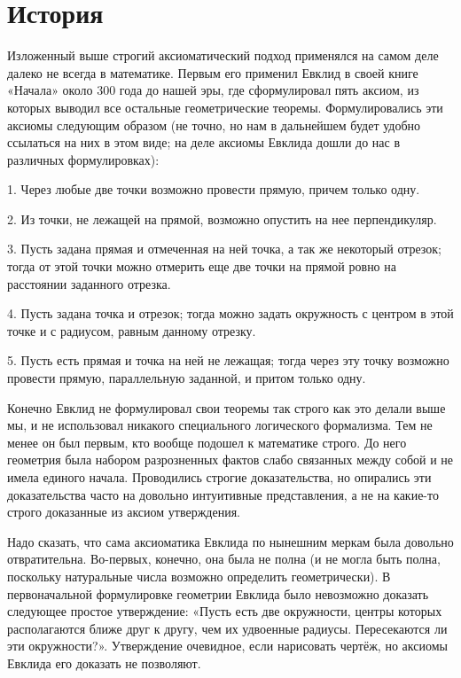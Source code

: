 \section{История}

Изложенный выше строгий аксиоматический подход применялся на самом деле далеко не всегда в математике. Первым его применил Евклид в своей книге «Начала» около 300 года до нашей эры, где сформулировал пять аксиом, из которых выводил все остальные геометрические теоремы. Формулировались эти аксиомы следующим образом (не точно, но нам в дальнейшем будет удобно ссылаться на них в этом виде; на деле аксиомы Евклида дошли до нас в различных формулировках):

1. Через любые две точки возможно провести прямую, причем только одну.

2. Из точки, не лежащей на прямой, возможно опустить на нее перпендикуляр.

3. Пусть задана прямая и отмеченная на ней точка, а так же некоторый отрезок; тогда от этой точки можно отмерить еще две точки на прямой ровно на расстоянии заданного отрезка.

4. Пусть задана точка и отрезок; тогда можно задать окружность с центром в этой точке и с радиусом, равным данному отрезку.

5. Пусть есть прямая и точка на ней не лежащая; тогда через эту точку возможно провести прямую, параллельную заданной, и притом только одну.

Конечно Евклид не формулировал свои теоремы так строго как это делали выше мы, и не использовал никакого специального логического формализма. Тем не менее он был первым, кто вообще подошел к математике строго. До него геометрия была набором разрозненных фактов слабо связанных между собой и не имела единого начала. Проводились строгие доказательства, но опирались эти доказательства часто на довольно интуитивные представления, а не на какие-то строго доказанные из аксиом утверждения.

Надо сказать, что сама аксиоматика Евклида по нынешним меркам была довольно отвратительна. Во-первых, конечно, она была не полна (и не могла быть полна, поскольку натуральные числа возможно определить геометрически). В первоначальной формулировке геометрии Евклида было невозможно доказать следующее простое утверждение: «Пусть есть две окружности, центры которых располагаются ближе друг к другу, чем их удвоенные радиусы. Пересекаются ли эти окружности?». Утверждение очевидное, если нарисовать чертёж, но аксиомы Евклида его доказать не позволяют.

